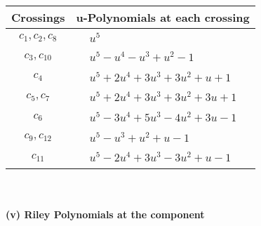 \documentclass[1p]{elsarticle_modified}
\theoremstyle{definition}
\begin{document}
\begin{tabular}{m{50pt}|m{274pt}}
Crossings & \hspace{64pt}u-Polynomials at each crossing \\
\hline $$\begin{aligned}c_{1},c_{2},c_{8}\end{aligned}$$&$\begin{aligned}
&u^5
\end{aligned}$\\
\hline $$\begin{aligned}c_{3},c_{10}\end{aligned}$$&$\begin{aligned}
&u^5- u^4- u^3+u^2-1
\end{aligned}$\\
\hline $$\begin{aligned}c_{4}\end{aligned}$$&$\begin{aligned}
&u^5+2 u^4+3 u^3+3 u^2+u+1
\end{aligned}$\\
\hline $$\begin{aligned}c_{5},c_{7}\end{aligned}$$&$\begin{aligned}
&u^5+2 u^4+3 u^3+3 u^2+3 u+1
\end{aligned}$\\
\hline $$\begin{aligned}c_{6}\end{aligned}$$&$\begin{aligned}
&u^5-3 u^4+5 u^3-4 u^2+3 u-1
\end{aligned}$\\
\hline $$\begin{aligned}c_{9},c_{12}\end{aligned}$$&$\begin{aligned}
&u^5- u^3+u^2+u-1
\end{aligned}$\\
\hline $$\begin{aligned}c_{11}\end{aligned}$$&$\begin{aligned}
&u^5-2 u^4+3 u^3-3 u^2+u-1
\end{aligned}$\\
\hline
\end{tabular}\\~\\
\newpage\renewcommand{\arraystretch}{1}
\flushleft \textbf{(v) Riley Polynomials at the component}\newline \\
\end{document}
